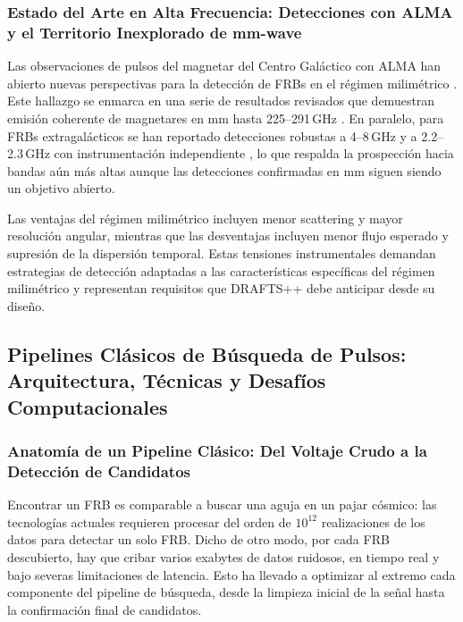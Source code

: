\subsubsection{Estado del Arte en Alta Frecuencia: Detecciones con ALMA y el Territorio Inexplorado de mm-wave}

Las observaciones de pulsos del magnetar del Centro Galáctico con ALMA han abierto nuevas perspectivas para la detección de FRBs en el régimen milimétrico \citep{veracasanova2025}. Este hallazgo se enmarca en una serie de resultados revisados que demuestran emisión coherente de magnetares en mm hasta 225--291\,GHz \citep{Torne2015,Torne2017}. En paralelo, para FRBs extragalácticos se han reportado detecciones robustas a 4--8\,GHz \citep{Gajjar2018,Bethapudi2023} y a 2.2--2.3\,GHz con instrumentación independiente \citep{Majid2021}, lo que respalda la prospección hacia bandas aún más altas aunque las detecciones confirmadas en mm siguen siendo un objetivo abierto.

Las ventajas del régimen milimétrico incluyen menor scattering y mayor resolución angular, mientras que las desventajas incluyen menor flujo esperado y supresión de la dispersión temporal. Estas tensiones instrumentales demandan estrategias de detección adaptadas a las características específicas del régimen milimétrico \citep{veracasanova2025} y representan requisitos que DRAFTS++ debe anticipar desde su diseño.

\subsection{Pipelines Clásicos de Búsqueda de Pulsos: Arquitectura, Técnicas y Desafíos Computacionales}

\subsubsection{Anatomía de un Pipeline Clásico: Del Voltaje Crudo a la Detección de Candidatos}

Encontrar un FRB es comparable a buscar una aguja en un pajar cósmico: las tecnologías actuales requieren procesar del orden de $10^{12}$ realizaciones de los datos para detectar un solo FRB. Dicho de otro modo, por cada FRB descubierto, hay que cribar varios exabytes de datos ruidosos, en tiempo real y bajo severas limitaciones de latencia. Esto ha llevado a optimizar al extremo cada componente del pipeline de búsqueda, desde la limpieza inicial de la señal hasta la confirmación final de candidatos.

